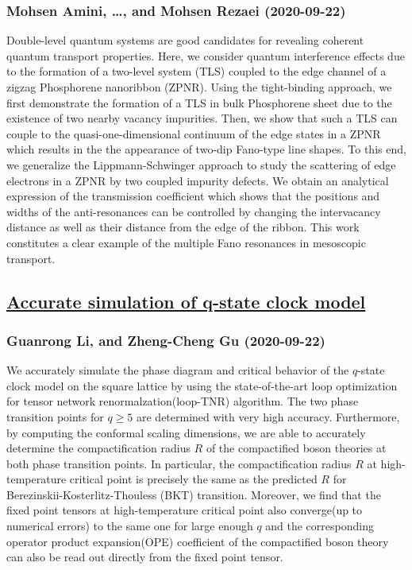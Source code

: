 {\subsubsection*{Mohsen Amini, \dots, and Mohsen Rezaei (2020-09-22)}
Double-level quantum systems are good candidates for revealing coherent
quantum transport properties. Here, we consider quantum interference effects
due to the formation of a two-level system (TLS) coupled to the edge channel of
a zigzag Phosphorene nanoribbon (ZPNR). Using the tight-binding approach, we
first demonstrate the formation of a TLS in bulk Phosphorene sheet due to the
existence of two nearby vacancy impurities. Then, we show that such a TLS can
couple to the quasi-one-dimensional continuum of the edge states in a ZPNR
which results in the the appearance of two-dip Fano-type line shapes. To this
end, we generalize the Lippmann-Schwinger approach to study the scattering of
edge electrons in a ZPNR by two coupled impurity defects. We obtain an
analytical expression of the transmission coefficient which shows that the
positions and widths of the anti-resonances can be controlled by changing the
intervacancy distance as well as their distance from the edge of the ribbon.
This work constitutes a clear example of the multiple Fano resonances in
mesoscopic transport.

\subsection*{\href{http://arxiv.org/abs/2009.10695v1}{Accurate simulation of q-state clock model}}
\subsubsection*{Guanrong Li, and Zheng-Cheng Gu (2020-09-22)}
We accurately simulate the phase diagram and critical behavior of the
$q$-state clock model on the square lattice by using the state-of-the-art loop
optimization for tensor network renormalzation(loop-TNR) algorithm. The two
phase transition points for $q \geq 5$ are determined with very high accuracy.
Furthermore, by computing the conformal scaling dimensions, we are able to
accurately determine the compactification radius $R$ of the compactified boson
theories at both phase transition points. In particular, the compactification
radius $R$ at high-temperature critical point is precisely the same as the
predicted $R$ for Berezinskii-Kosterlitz-Thouless (BKT) transition. Moreover,
we find that the fixed point tensors at high-temperature critical point also
converge(up to numerical errors) to the same one for large enough $q$ and the
corresponding operator product expansion(OPE) coefficient of the compactified
boson theory can also be read out directly from the fixed point tensor.

}
